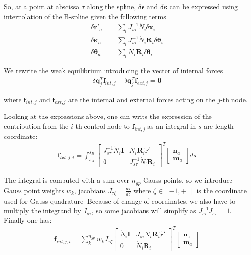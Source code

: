 \documentclass[review]{elsarticle}
\def\avect#1{{\boldsymbol{#1}}}
\def\amatr#1{{\boldsymbol{#1}}}
\begin{document}
So, at a point at abscissa $\tau$ along the spline, $\delta\avect{\epsilon}$ and $\delta\avect{\kappa}$ can be expressed using interpolation of the B-spline given the following terms:
%
\begin{align}
\delta\avect{r}'_a       &= \sum_i J^{-1}_{s\tau} \mathring{N}_i \delta\avect{x}_i    \\
\delta\avect{\kappa}_a   &= \sum_i J^{-1}_{s\tau} \mathring{N}_i \amatr{R}_i \delta\avect{\theta}_i \\
\delta\avect{\theta}_a   &= \sum_i      {N}_i \amatr{R}_i \delta\avect{\theta}_i
\end{align}

We rewrite the weak equilibrium introducing the vector of internal forces
%
\begin{align}
\delta\avect{q}^T_j \avect{f}_{int,j} -  \delta\avect{q}^T_j \avect{f}_{ext,j} = \avect{0} 
\end{align}

where $\avect{f}_{int,j}$ and $\avect{f}_{ext,j}$ are the internal and external forces acting on the $j$-th node.

Looking at the expressions above, one can write the expression of the contribution from the $i$-th control node to $\avect{f}_{int,j}$ as an integral in $s$ arc-length coordinate:
%
\begin{align}
\avect{f}_{int,j,i} = \int_{s_A}^{s_B} 
 \left[  
	\begin{array}{cc}
	 J^{-1}_{s\tau} \mathring{N}_i  \amatr{I}  &  N_i \amatr{R}_i \tilde{\avect{r}}'\\
	 0                           & J^{-1}_{s\tau} \mathring{N}_i \amatr{R}_i 
	\end{array}
	\right]^T
	\left[  
	\begin{array}{c}
	 \avect{n}_a  \\
	 \avect{m}_a  
	\end{array}
	\right]
	ds
\end{align}

The integral is computed with a sum over $n_{gp}$ Gauss points, so we introduce Gauss point weights $w_k$, jacobians $J_{\tau\zeta} = \frac{d\tau}{d\zeta}$ where $\zeta \in [-1,+1]$ is the coordinate used for Gauss quadrature. Because of change of coordinates, we also have to multiply the integrand by $J_{s\tau}$, so some jacobians will simplify as $J^{-1}_{s\tau} J_{s\tau}=1$. 
Finally one has:
%
\begin{align}
\avect{f}_{int,j,i} = \sum_k^{n_{gp}} 
 w_k J_{\tau\zeta}
 \left[  
	\begin{array}{cc}
	 \mathring{N}_i \amatr{I}   & J_{s\tau} N_i \amatr{R}_i \tilde{\avect{r}}'\\
	 0                     & \mathring{N}_i \amatr{R}_i 
	\end{array}
	\right]^T
	\left[  
	\begin{array}{c}
	 \avect{n}_a  \\
	 \avect{m}_a  
	\end{array}
	\right]
	\label{fint}
\end{align}
\end{document}
